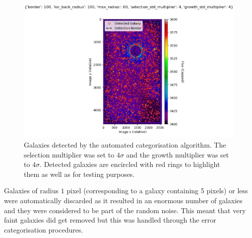 \documentclass[journal]{IEEEtran}
\begin{document}
\begin{figure}[H]
    \centering
    \includegraphics[width = \linewidth]{Figure_7.png}
    \caption{Galaxies detected by the automated categorisation algorithm. The selection multiplier was set to $4\sigma$ and the growth multiplier was set to $4\sigma$. Detected galaxies are encircled with red rings to highlight them as well as for testing purposes.}
    \label{fig:5}
\end{figure}

\noindent Galaxies of radius $1$ pixel (corresponding to a galaxy containing 5 pixels) or less were automatically discarded as it resulted in an enormous number of galaxies and they were considered to be part of the random noise. This meant that very faint galaxies did get removed but this was handled through the error categorisation procedures. \newline
\end{document}
